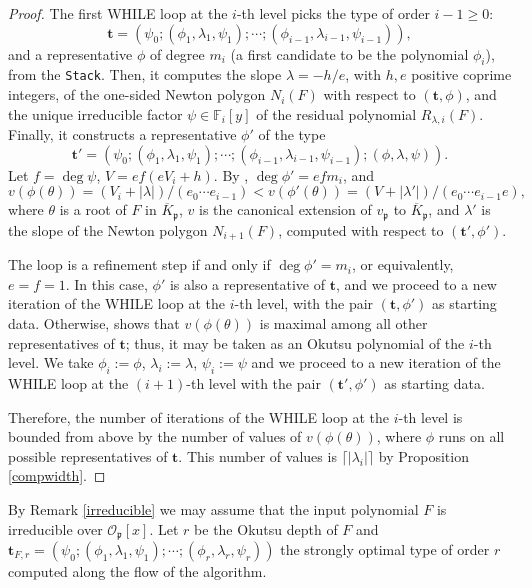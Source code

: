 \documentclass{amsart}
\begin{document}
\begin{proof}
The first WHILE loop at the $i$-th level picks the type of order $i-1\ge0$: 
$${\mathbf{t}}=(\psi_0;(\phi_1,\lambda_1,\psi_1);\cdots;(\phi_{i-1},\lambda_{i-1},\psi_{i-1})),$$
and a representative $\phi$ of degree $m_i$ (a first candidate to be the polynomial $\phi_{i}$),
from the {\tt Stack}. Then, it computes the slope $\lambda=-h/e$, with $h,e$ positive coprime integers, of the one-sided Newton polygon $N_i(F)$ with respect to $({\mathbf{t}},\phi)$, and the unique irreducible factor $\psi\in{\mathbb F}_i[y]$ of the residual polynomial $R_{\lambda,i}(F)$. Finally, it constructs a representative $\phi'$ of the type
$${\mathbf{t}}'=(\psi_0;(\phi_1,\lambda_1,\psi_1);\cdots;(\phi_{i-1},\lambda_{i-1},\psi_{i-1});(\phi,\lambda,\psi)).$$
Let $f=\deg\psi$, $V=ef(eV_i+h)$. By \cite[Thms. 2.11,3.1]{HN}, $\deg \phi'=efm_i$, and
$$ v(\phi({\theta}))=(V_i+|\lambda|)/(e_0\cdots e_{i-1})< v(\phi'({\theta}))=(V+|\lambda'|)/(e_0\cdots e_{i-1}e),
$$ 
where ${\theta}$ is a root of $F$ in $\overline{K}_{\mathfrak{p}}$, $v$ is the canonical extension of $v_{\mathfrak{p}}$ to  $\overline{K}_{\mathfrak{p}}$, and $\lambda'$ is the slope of the Newton polygon $N_{i+1}(F)$, computed with respect to $({\mathbf{t}}',\phi')$.

The loop is a refinement step if and only if $\deg\phi'=m_i$, or equivalently, $e=f=1$. In this case, $\phi'$ is also a representative of ${\mathbf{t}}$, and we proceed to a new iteration of the WHILE loop at the $i$-th level, with the pair $({\mathbf{t}},\phi')$ as starting data. Otherwise, \cite[Thm. 3.1]{algorithm} shows that $v(\phi({\theta}))$ is maximal among all other representatives of ${\mathbf{t}}$; thus, it may be taken as an Okutsu polynomial of the $i$-th level. We take $\phi_i:=\phi$, $\lambda_i:=\lambda$, $\psi_i:=\psi$ and we proceed to a new iteration of the WHILE loop at the $(i+1)$-th level with the pair $({\mathbf{t}}',\phi')$ as starting data. 

Therefore, the number of iterations of the WHILE loop at the $i$-th level is bounded from above by the number of values of $v(\phi({\theta}))$, where $\phi$ runs on all possible representatives of ${\mathbf{t}}$. This number of values is $\lceil|\lambda_i|\rceil$ by Proposition \ref{compwidth}.
\end{proof}

By Remark \ref{irreducible} we may assume that the input polynomial $F$ is irreducible over ${\mathcal{O}}_{\mathfrak{p}}[x]$. Let $r$ be the Okutsu depth of $F$ and ${\mathbf{t}}_{F,r}=(\psi_0;(\phi_1,\lambda_1,\psi_1);\cdots;(\phi_{r},\lambda_{r},\psi_{r}))$ the strongly optimal type of order $r$ computed along the flow of the algorithm.
 
\end{document}
